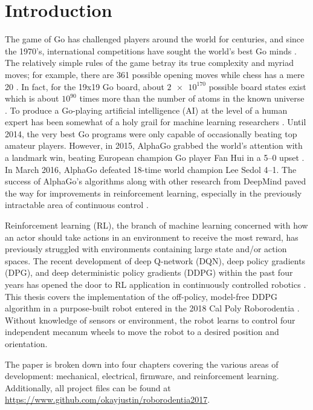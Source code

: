 \chapter{Introduction}
The game of Go has challenged players around the world for centuries, and since the 1970's, international competitions have sought the world's best Go minds \cite{go}. The relatively simple rules of the game betray its true complexity and myriad moves; for example, there are 361 possible opening moves while chess has a mere 20 \cite{brit_go}. In fact, for the 19x19 Go board, about $\num{2e170}$ possible board states exist which is about $10^{90}$ times more than the number of atoms in the known universe \cite{go_num}. To produce a Go-playing artificial intelligence (AI) at the level of a human expert has been somewhat of a holy grail for machine learning researchers \cite{brit_go2}. Until 2014, the very best Go programs were only capable of occasionally beating top amateur players. However, in 2015, AlphaGo grabbed the world's attention with a landmark win, beating European champion Go player Fan Hui in a 5--0 upset \cite{brit_go3}. In March 2016, AlphaGo defeated 18-time world champion Lee Sedol 4--1. The success of AlphaGo's algorithms along with other research from DeepMind paved the way for improvements in reinforcement learning, especially in the previously intractable area of continuous control \cite{Mnih_2015}\cite{silver_2017}.

 Reinforcement learning (RL), the branch of machine learning concerned with how an actor should take actions in an environment to receive the most reward, has previously struggled with environments containing large state and/or action spaces. The recent  development of deep Q-network (DQN), deep policy gradients (DPG), and deep deterministic policy gradients (DDPG) within the past four years has opened the door to RL application in continuously controlled robotics  \cite{Mnih_2015}\cite{silver_lever_heess_degris_wierstra_riedmiller}\cite{lillicrap_2016}. This thesis covers the implementation of the off-policy, model-free DDPG algorithm in a purpose-built robot entered in the 2018 Cal Poly Roborodentia \cite{roborodentia}. Without knowledge of sensors or environment, the robot learns to control four independent mecanum wheels to move the robot to a desired position and orientation. 
 
 The paper is broken down into four chapters covering the various areas of development: mechanical, electrical, firmware, and reinforcement learning. Additionally, all project files can be found at \url{https://www.github.com/okayjustin/roborodentia2017}.


